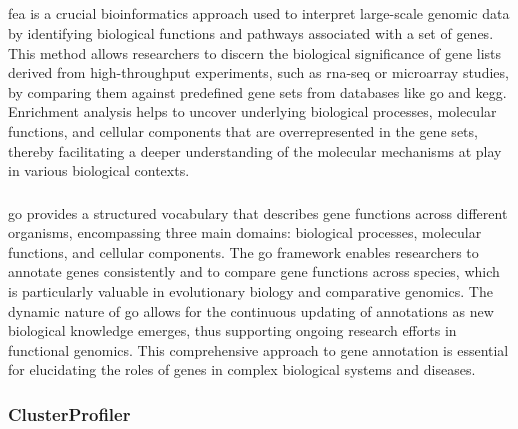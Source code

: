 \subsection{}

\Gls{fea} is a crucial bioinformatics approach used to
interpret large-scale genomic data by identifying biological functions and
pathways associated with a set of genes.
This method allows researchers to discern the biological significance of gene
lists derived from high-throughput experiments, such as \gls{rna-seq} or
microarray studies, by comparing them against predefined gene sets from
databases like \gls{go} and
\gls{kegg}\supercite{du_kegg-path_2014,wu_clusterprofiler_2021}.
Enrichment analysis helps to uncover underlying biological processes, molecular
functions, and cellular components that are overrepresented in the gene sets,
thereby facilitating a deeper understanding of the molecular mechanisms at play
in various biological contexts\supercite{wu_clusterprofiler_2021}.

\subsubsection{}

\Gls{go} provides a structured vocabulary that describes gene
functions across different organisms, encompassing three main domains:
biological processes, molecular functions, and cellular
components\supercite{ashburner_gene_2000}.
The \gls{go} framework enables researchers to annotate genes consistently and
to compare gene functions across species, which is particularly valuable in
evolutionary biology and comparative genomics\supercite{ashburner_gene_2000}.
The dynamic nature of \gls{go} allows for the continuous updating of
annotations as new biological knowledge emerges, thus supporting ongoing
research efforts in functional genomics\supercite{ashburner_gene_2000}.
This comprehensive approach to gene annotation is essential for elucidating the
roles of genes in complex biological systems and diseases.

\subsubsection{ClusterProfiler}

